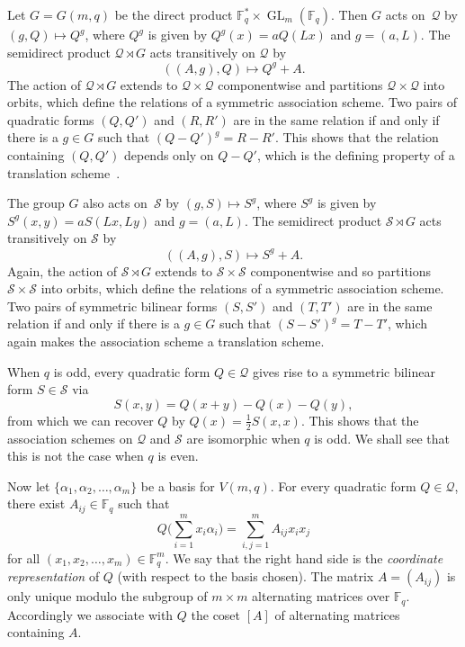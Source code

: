 \documentclass[10pt]{article}
\theoremstyle{definition}
\newcommand{\FF}{\mathbb{F}}
\newcommand{\Q}{\mathscr{Q}}
\renewcommand{\S}{\mathscr{S}}
\DeclareMathOperator{\GL}{GL}
\begin{document}
Let $G=G(m,q)$ be the direct product $\FF_q^*\times\GL_m(\FF_q)$. Then $G$ acts on~$\Q$ by $(g,Q)\mapsto Q^g$, where $Q^g$ is given by $Q^g(x)=aQ(Lx)$ and $g=(a,L)$. The semidirect product $\Q\rtimes G$ acts transitively on $\Q$ by
\[
((A,g),Q)\mapsto Q^g+A.
\]
The action of $\Q\rtimes G$ extends to $\Q\times\Q$ componentwise and partitions $\Q\times \Q$ into orbits, which define the relations of a symmetric association scheme. Two pairs of quadratic forms $(Q,Q')$ and $(R,R')$ are in the same relation if and only if there is a $g\in G$ such that $(Q-Q')^g=R-R'$. This shows that the relation containing $(Q,Q')$ depends only on $Q-Q'$, which is the defining property of a translation scheme~\cite[Chapter V]{DelLev1998}.
\par
The group $G$ also acts on~$\S$ by $(g,S)\mapsto S^g$, where $S^g$ is given by $S^g(x,y)=aS(Lx,Ly)$ and $g=(a,L)$. The semidirect product $\S\rtimes G$ acts transitively on $\S$ by
\[
((A,g),S)\mapsto S^g+A.
\]
Again, the action of $\S\rtimes G$ extends to $\S\times\S$ componentwise and so partitions $\S\times \S$ into orbits, which define the relations of a symmetric association scheme. Two pairs of symmetric bilinear forms $(S,S')$ and $(T,T')$ are in the same relation if and only if there is a $g\in G$ such that $(S-S')^g=T-T'$, which again makes the association scheme a translation scheme.
\par
When $q$ is odd, every quadratic form $Q\in\Q$ gives rise to a symmetric bilinear form $S\in\S$ via
\begin{equation}
S(x,y)=Q(x+y)-Q(x)-Q(y),   \label{eqn:S_from_Q}
\end{equation}
from which we can recover $Q$ by $Q(x)=\tfrac{1}{2}S(x,x)$. This shows that the association schemes on $\Q$ and $\S$ are isomorphic when $q$ is odd. We shall see that this is not the case when $q$ is even.
\par
Now let $\{\alpha_1,\alpha_2,\dots,\alpha_m\}$ be a basis for $V(m,q)$. For every quadratic form $Q\in\Q$, there exist $A_{ij}\in\FF_q$ such that
\begin{equation}
Q\bigg(\sum_{i=1}^mx_i\alpha_i\bigg)=\sum_{i,j=1}^mA_{ij}x_ix_j   \label{eqn:coordinate_rep_Q}
\end{equation}
for all $(x_1,x_2,\dots,x_m)\in\FF_q^m$. We say that the right hand side is the \emph{coordinate representation} of $Q$ (with respect to the basis chosen). The matrix $A=(A_{ij})$ is only unique modulo the subgroup of $m\times m$ alternating matrices over $\FF_q$. Accordingly we associate with $Q$ the coset $[A]$ of alternating matrices containing $A$.
\end{document}

